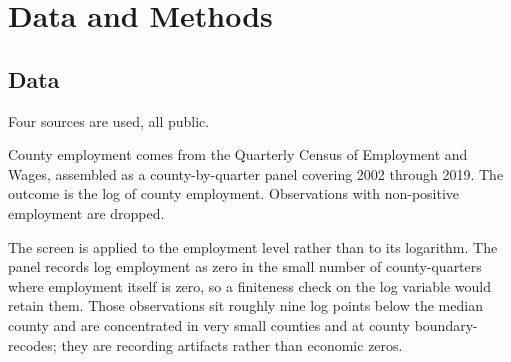 %
%

\section{Data and Methods}

\subsection{Data}

Four sources are used, all public.

County employment comes from the Quarterly Census of Employment and Wages,
assembled as a county-by-quarter panel covering 2002 through 2019. The outcome
is the log of county employment. Observations with non-positive employment are
dropped.

The screen is applied to the employment level rather than to its logarithm. The
panel records log employment as zero in the small number of county-quarters
where employment itself is zero, so a finiteness check on the log variable would
retain them. Those observations sit roughly nine log points below the median
county and are concentrated in very small counties and at county
boundary-recodes; they are recording artifacts rather than economic zeros.

